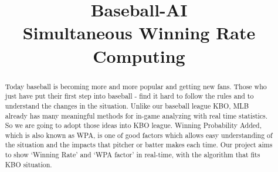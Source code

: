\documentclass[conference,compsoc, twocolumn]{IEEEtran}
\begin{document}
\title{Baseball-AI\\ Simultaneous Winning Rate Computing}

\author{
}

\maketitle

\begin{abstract}
\quad Today baseball is becoming more and more popular and getting new fans. Those who just have put their first step into baseball - find it hard to follow the rules and to understand the changes in the situation. Unlike our baseball league KBO, MLB already has many meaningful methods for in-game analyzing with real time statistics. So we are going to adopt those ideas into KBO league. Winning Probability Added, which is also known as WPA, is one of good factors which allows easy understanding of the situation and the impacts that pitcher or batter makes each time. Our project aims to show ‘Winning Rate’ and ‘WPA factor’ in real-time, with the algorithm that fits KBO situation.
\end{abstract}
\end{document}
